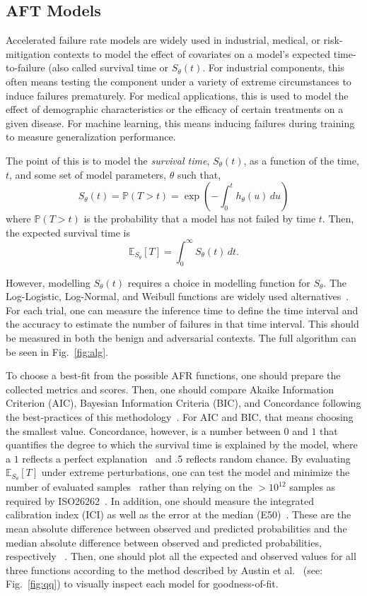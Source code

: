 \documentclass[conference]{IEEEtran}
\begin{document}
\subsection{AFT Models}
\label{survival_time}
Accelerated failure rate models are widely used in industrial, medical, or risk-mitigation contexts \cite{kleinbaum1996survival, aft_models} to model the effect of covariates on a model's expected time-to-failure (also called survival time or $S_{\theta}(t)$. For industrial components, this often means testing the component under a variety  of extreme circumstances to induce failures prematurely. For medical applications, this is used to model the effect of demographic characteristics or the efficacy of certain treatments on a given disease. For machine learning, this means inducing failures during training to measure generalization performance.

The point of this is to model the \textit{survival time}, $S_{\theta}(t)$, as a function of the time, $t$,  and some set of model parameters, $\theta$ such that,
$$
S_{\theta}(t)= \mathbb{P}(T>t) = \exp\left(-\int_0^t h_{\theta}(u) \, du\right)
$$
where $\mathbb{P}(T>t)$ is the probability that a model has not failed by time $t$. Then, the expected survival time is
\[
	\mathbb{E}_{S_\theta}[T] = \int_0^{\infty}  S_\theta(t) \,dt.
\]

However, modelling $S_{\theta}(t)$ requires a choice in modelling function for $S_{\theta}$. The Log-Logistic, Log-Normal, and Weibull functions are widely used alternatives~\cite{kleinbaum1996survival}. For each trial, one can measure the inference time to define the time interval and the accuracy to estimate the number of failures in that time interval. This should be measured in both the benign and adversarial contexts. The full algorithm can be seen in Fig.~\ref{fig:alg}.

To choose a best-fit from the possible AFR functions, one should prepare the collected metrics and scores. Then, one should compare Akaike Information Criterion (AIC), Bayesian Information Criteria (BIC), and Concordance following the best-practices of this methodology~\cite{aft_models,kleinbaum1996survival}. For AIC and BIC, that means choosing the smallest value. Concordance, however, is a number between $0$ and $1$ that quantifies the degree to which the survival time is explained by the model, where a $1$ reflects a perfect explanation~\cite{kleinbaum1996survival} and .5 reflects random chance. By evaluating $\mathbb{E}_{S_\theta}[T]$ under extreme perturbations, one can test the model and minimize the number of evaluated samples~\cite{aft_models,kleinbaum1996survival} rather than relying on the $> 10^{12}$ samples as required by ISO26262~\cite{iso26262}. In addition, one should measure the integrated calibration index (ICI) as well as the error at the median (E50)~\cite{ici}. These are the mean absolute difference between observed and predicted probabilities and the median absolute difference between observed and predicted probabilities, respectively ~\cite{ici}. Then, one should plot all the expected and observed values for all three functions according to the method described by Austin et al.~\cite{ici} (see: Fig.~\ref{fig:qq}) to visually inspect each model for goodness-of-fit.
\end{document}
